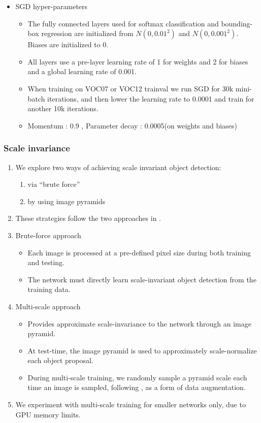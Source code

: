 \documentclass[11pt]{article}
\begin{document}
\begin{itemize}
\item SGD hyper-parameters\\
\label{sec-1-1-3-4}%
\begin{itemize}
\item The fully connected layers used for softmax classification and bounding-box regression
       are initialized from $N(0,0.01^2)$ and $N(0,0.001^2)$. Biases are initialized to 0.
\item All layers use a pre-layer learning rate of 1 for weights and 2 for biases and a global
       learning rate of 0.001.
\item When training on VOC07 or VOC12 trainval we run SGD for 30k mini-batch iterations, and
       then lower the learning rate to 0.0001 and train for another 10k iterations.
\item Momentum : 0.9 , Parameter decay : 0.0005(on weights and biases)
\end{itemize}

       


\end{itemize} %
\subsubsection{Scale invariance}
\label{sec-1-1-4}


\begin{enumerate}
\item We explore two ways of achieving scale invariant object detection:
\begin{enumerate}
\item via ``brute force''
\item by using image pyramids
\end{enumerate}
\item These strategies follow the two approaches in \footnotemark[4].
\item Brute-force approach
\begin{itemize}
\item Each image is processed at a pre-defined pixel size during both training and testing.
\item The network must directly learn scale-invariant object detection from the training data.
\end{itemize}
\item Multi-scale approach
\begin{itemize}
\item Provides approximate scale-invariance to the network through an image pyramid.
\item At test-time, the image pyramid is used to approximately scale-normalize each object 
         proposal.
\item During multi-scale training, we randomly sample a pyramid scale each time an image is
         sampled, following \footnotemark[4], as a form of data augmentation.
\end{itemize}
\item We experiment with multi-scale training for smaller networks only, due to GPU memory limits.
\end{enumerate}


          
\end{document}
